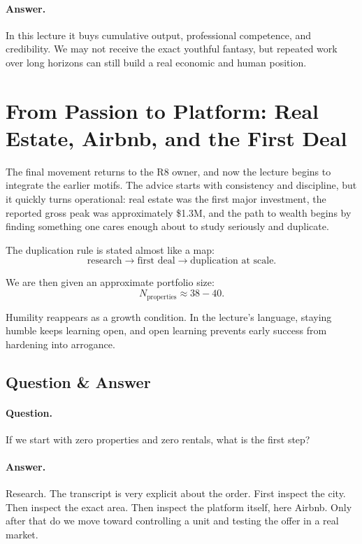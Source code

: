 \paragraph{Answer.} In this lecture it buys cumulative output, professional competence, and credibility. We may not receive the exact youthful fantasy, but repeated work over long horizons can still build a real economic and human position.

\section{From Passion to Platform: Real Estate, Airbnb, and the First Deal}

The final movement returns to the R8 owner, and now the lecture begins to integrate the earlier motifs. The advice starts with consistency and discipline, but it quickly turns operational: real estate was the first major investment, the reported gross peak was approximately \$1.3M, and the path to wealth begins by finding something one cares enough about to study seriously and duplicate.

The duplication rule is stated almost like a map:
\begin{equation}
\text{research} \to \text{first deal} \to \text{duplication at scale}.
\end{equation}

We are then given an approximate portfolio size:
\begin{equation}
N_{\text{properties}} \approx 38 - 40.
\end{equation}

Humility reappears as a growth condition. In the lecture's language, staying humble keeps learning open, and open learning prevents early success from hardening into arrogance.

\subsection{Question \& Answer}

\paragraph{Question.} If we start with zero properties and zero rentals, what is the first step?

\paragraph{Answer.} Research. The transcript is very explicit about the order. First inspect the city. Then inspect the exact area. Then inspect the platform itself, here Airbnb. Only after that do we move toward controlling a unit and testing the offer in a real market.

